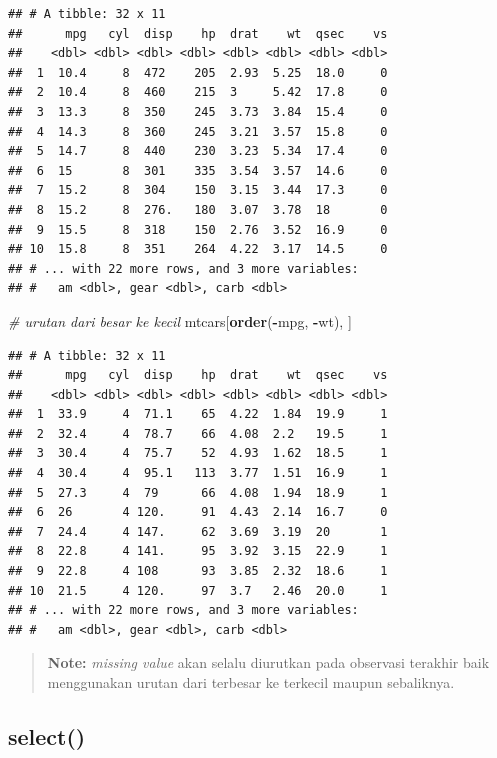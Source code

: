 \documentclass[]{book}
\newenvironment{Shaded}{\begin{snugshade}}{\end{snugshade}}
\newcommand{\KeywordTok}[1]{\textcolor[rgb]{0.13,0.29,0.53}{\textbf{#1}}}
\newcommand{\CommentTok}[1]{\textcolor[rgb]{0.56,0.35,0.01}{\textit{#1}}}
\newcommand{\OperatorTok}[1]{\textcolor[rgb]{0.81,0.36,0.00}{\textbf{#1}}}
\newcommand{\NormalTok}[1]{#1}
\begin{document}
\begin{verbatim}
## # A tibble: 32 x 11
##      mpg   cyl  disp    hp  drat    wt  qsec    vs
##    <dbl> <dbl> <dbl> <dbl> <dbl> <dbl> <dbl> <dbl>
##  1  10.4     8  472    205  2.93  5.25  18.0     0
##  2  10.4     8  460    215  3     5.42  17.8     0
##  3  13.3     8  350    245  3.73  3.84  15.4     0
##  4  14.3     8  360    245  3.21  3.57  15.8     0
##  5  14.7     8  440    230  3.23  5.34  17.4     0
##  6  15       8  301    335  3.54  3.57  14.6     0
##  7  15.2     8  304    150  3.15  3.44  17.3     0
##  8  15.2     8  276.   180  3.07  3.78  18       0
##  9  15.5     8  318    150  2.76  3.52  16.9     0
## 10  15.8     8  351    264  4.22  3.17  14.5     0
## # ... with 22 more rows, and 3 more variables:
## #   am <dbl>, gear <dbl>, carb <dbl>
\end{verbatim}

\begin{Shaded}
\begin{Highlighting}[]
\CommentTok{# urutan dari besar ke kecil}
\NormalTok{mtcars[}\KeywordTok{order}\NormalTok{(}\OperatorTok{-}\NormalTok{mpg, }\OperatorTok{-}\NormalTok{wt), ]}
\end{Highlighting}
\end{Shaded}

\begin{verbatim}
## # A tibble: 32 x 11
##      mpg   cyl  disp    hp  drat    wt  qsec    vs
##    <dbl> <dbl> <dbl> <dbl> <dbl> <dbl> <dbl> <dbl>
##  1  33.9     4  71.1    65  4.22  1.84  19.9     1
##  2  32.4     4  78.7    66  4.08  2.2   19.5     1
##  3  30.4     4  75.7    52  4.93  1.62  18.5     1
##  4  30.4     4  95.1   113  3.77  1.51  16.9     1
##  5  27.3     4  79      66  4.08  1.94  18.9     1
##  6  26       4 120.     91  4.43  2.14  16.7     0
##  7  24.4     4 147.     62  3.69  3.19  20       1
##  8  22.8     4 141.     95  3.92  3.15  22.9     1
##  9  22.8     4 108      93  3.85  2.32  18.6     1
## 10  21.5     4 120.     97  3.7   2.46  20.0     1
## # ... with 22 more rows, and 3 more variables:
## #   am <dbl>, gear <dbl>, carb <dbl>
\end{verbatim}

\begin{quote}
\textbf{Note: } \emph{missing value} akan selalu diurutkan pada
observasi terakhir baik menggunakan urutan dari terbesar ke terkecil
maupun sebaliknya.
\end{quote}

\subsection{select()}\label{select}
\end{document}
